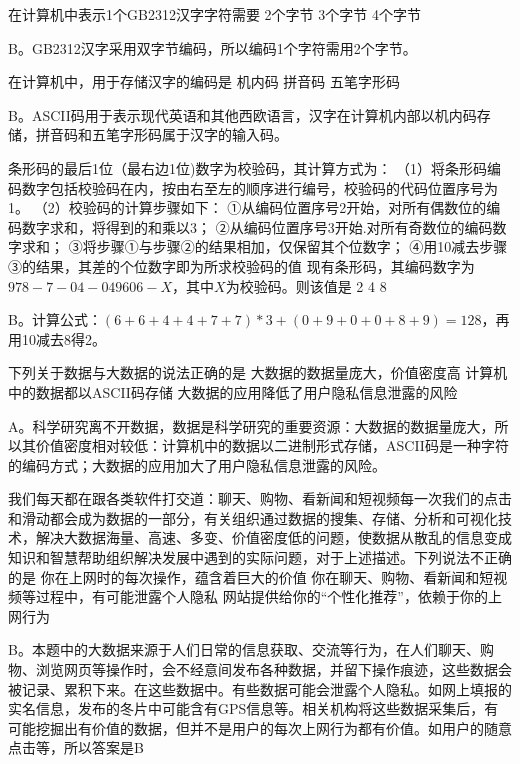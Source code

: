 \begin{groups}
\begin{questions}[rp]
\question
{}在计算机中表示1个GB2312汉字字符需要
{2个字节}
{3个字节}
{4个字节}
\begin{solution}
B。GB2312汉字采用双字节编码，所以编码1个字符需用2个字节。
\end{solution}

\question
{}在计算机中，用于存储汉字的编码是
{机内码}
{拼音码}
{五笔字形码}
\begin{solution}
B。ASCII码用于表示现代英语和其他西欧语言，汉字在计算机内部以机内码存储，拼音码和五笔字形码属于汉字的输入码。
\end{solution}

\question
{}条形码的最后1位（最右边1位)数字为校验码，其计算方式为：
（1）将条形码编码数字包括校验码在内，按由右至左的顺序进行编号，校验码的代码位置序号为1。
（2）校验码的计算步骤如下：
①从编码位置序号2开始，对所有偶数位的编码数字求和，将得到的和乘以3；
②从编码位置序号3开始.对所有奇数位的编码数字求和；
③将步骤①与步骤②的结果相加，仅保留其个位数字；
④用10减去步骤③的结果，其差的个位数字即为所求校验码的值
现有条形码，其编码数字为$978-7-04-049606-X$，其中$X$为校验码。则该值是
{2}
{4}
{8}
\begin{solution}
B。计算公式：$(6+6+4+4+7+7)*3+(0+9+0+0+8+9)=128$，再用10减去8得2。
\end{solution}

\question
{}下列关于数据与大数据的说法正确的是
{大数据的数据量庞大，价值密度高}
{计算机中的数据都以ASCII码存储}
{大数据的应用降低了用户隐私信息泄露的风险}
\begin{solution}
A。科学研究离不开数据，数据是科学研究的重要资源：大数据的数据量庞大，所以其价值密度相对较低：计算机中的数据以二进制形式存储，ASCII码是一种字符的编码方式；大数据的应用加大了用户隐私信息泄露的风险。
\end{solution}

\question
{}我们每天都在跟各类软件打交道：聊天、购物、看新闻和短视频每一次我们的点击和滑动都会成为数据的一部分，有关组织通过数据的搜集、存储、分析和可视化技术，解决大数据海量、高速、多变、价值密度低的问题，使数据从散乱的信息变成知识和智慧帮助组织解决发展中遇到的实际问题，对于上述描述。下列说法不正确的是
{你在上网时的每次操作，蕴含着巨大的价值}
{你在聊天、购物、看新闻和短视频等过程中，有可能泄露个人隐私}
{网站提供给你的“个性化推荐”，依赖于你的上网行为}
\begin{solution}
B。本题中的大数据来源于人们日常的信息获取、交流等行为，在人们聊天、购物、浏览网页等操作时，会不经意间发布各种数据，并留下操作痕迹，这些数据会被记录、累积下来。在这些数据中。有些数据可能会泄露个人隐私。如网上填报的实名信息，发布的冬片中可能含有GPS信息等。相关机构将这些数据采集后，有可能挖掘出有价值的数据，但并不是用户的每次上网行为都有价值。如用户的随意点击等，所以答案是B
\end{solution}


\end{questions}
\end{groups}
